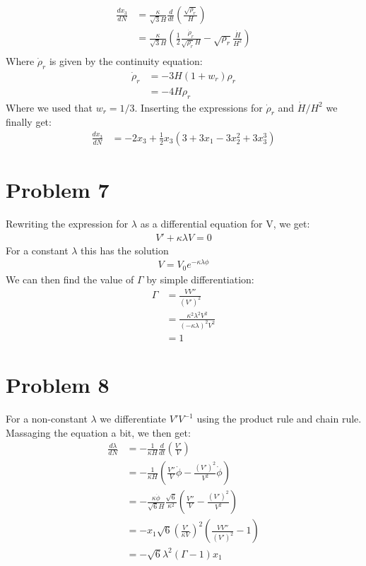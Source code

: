 \documentclass[reprint,english,notitlepage,nofootinbib]{revtex4-1}  %
\numberwithin{equation}{section}
\begin{document}
\begin{align}
	\frac{dx_3}{dN} &= \frac{\kappa}{\sqrt{3}H}\frac{d}{dt}\left(\frac{\sqrt{\rho_r}}{H}\right)\\
									&= \frac{\kappa}{\sqrt{3}H}\left(\frac{1}{2}\frac{\dot{\rho}_r}
									{\sqrt{\rho_r}H} - \sqrt{\rho_r}\frac{\dot{H}}{H^2}\right)\\
\end{align}
Where $\dot{\rho}_r$ is given by the continuity equation:
\begin{align}
	\dot{\rho}_r &= -3 H (1 + w_r)\rho_r \\
							 &= -4 H\rho_r
\end{align}
Where we used that $w_r=1/3$. Inserting the expressions for $\dot{\rho}_r$ and
$\dot{H}/H^2$ we finally get:
\begin{align}
	\frac{dx_3}{dN} &=-2x_3 + \frac{1}{2}x_3\left(3+3x_1 - 3x_2^2 + 3x_3^3\right)
\end{align}

\section{Problem 7}
Rewriting the expression for $\lambda$ as a differential equation for V, we get:
\begin{align}
	V' + \kappa \lambda V = 0
\end{align}
For a constant $\lambda$ this has the solution
\begin{align}
	V = V_0 e^{-\kappa\lambda\phi}
\end{align}
We can then find the value of $\Gamma$ by simple differentiation:
\begin{align}
	\Gamma &= \frac{V V''}{(V')^2} \\
				 &= \frac{\kappa^2\lambda^2 V^2}{(-\kappa\lambda)^2 V^2} \\
				 &= 1
\end{align}
\section{Problem 8}
For a non-constant $\lambda$ we differentiate $V'V^{-1}$ using the product rule
and chain rule. Massaging the equation a bit, we then get:
\begin{align}
	\frac{d\lambda}{dN} &= -\frac{1}{\kappa H}\frac{d}{dt}\left( \frac{V'}{V}\right) \\
											&= -\frac{1}{\kappa H}\left(\frac{V''}{V}\dot{\phi} -  \frac{(V')^2}{V^2}\dot{\phi}\right) \\
											&= -\frac{\kappa\dot{\phi}}{\sqrt{6}H}\frac{\sqrt{6}}{\kappa^2}
											\left(\frac{V''}{V} - \frac{(V')^2}{V^2}\right) \\
											&= -x_{1}\sqrt{6}\left(\frac{V'}{\kappa V}\right)^2
													\left(\frac{V V''}{(V')^2} - 1 \right) \\
											&= - \sqrt{6} \lambda^2 (\Gamma - 1) x_1
\end{align}
\end{document}
